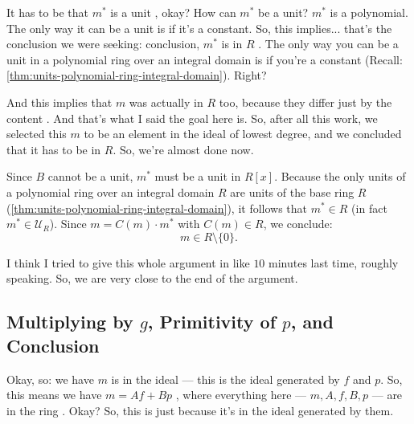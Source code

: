 \begin{proofWrapper}
\begin{speech}[00:33:18 - 00:34:35]
It has to be that $m^*$ is a unit , okay? How can $m^*$ be a unit? $m^*$ is a polynomial. The only way it can be a unit is if it's a constant. So, this implies... that's the conclusion we were seeking: conclusion, $m^*$ is in $R$ . The only way you can be a unit in a polynomial ring over an integral domain is if you're a constant (Recall: \cref{thm:units-polynomial-ring-integral-domain}). Right?

And this implies that $m$ was actually in $R$ too, because they differ just by the content . And that's what I said the goal here is. So, after all this work, we selected this $m$ to be an element in the ideal of lowest degree, and we concluded that it has to be in $R$. So, we're almost done now.
\end{speech}

\begin{content}
Since $B$ cannot be a unit, $m^*$ must be a unit in $R[x]$. Because the only units of a polynomial ring over an integral domain $R$ are units of the base ring $R$ (\cref{thm:units-polynomial-ring-integral-domain}), it follows that $m^* \in R$ (in fact $m^* \in \mathcal{U}_R$). Since $m = C(m) \cdot m^*$ with $C(m) \in R$, we conclude:
\begin{equation}\label{eq:m-in-R}
m \in R \setminus \{0\}.
\end{equation}
\end{content}

\begin{speech}[00:34:35 - 00:35:26]
 I think I tried to give this whole argument in like $10$ minutes last time, roughly speaking. So, we are very close to the end of the argument.
\end{speech}

\subsection{Multiplying by \texorpdfstring{$g$}{g}, Primitivity of \texorpdfstring{$p$}{p}, and Conclusion}

\begin{speech}[00:35:26 - 00:36:27]
Okay, so: we have $m$ is in the ideal  --- this is the ideal generated by $f$ and $p$. So, this means we have $m = Af + Bp$ , where everything here --- $m, A, f, B, p$ --- are in the ring . Okay? So, this is just because it's in the ideal generated by them.


\end{speech}
\end{proofWrapper}
